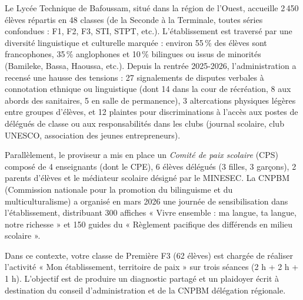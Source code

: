 \documentclass[11pt]{article}
\newcounter{popsec}
\newcounter{popsub}
\newcommand{\courssub}[1]{%
  \stepcounter{popsub}%
  \par\vspace{9pt}\noindent{\popxbold\fontsize{11.5}{13}\selectfont\color{popink}{\color{poporange}\thepopsec.\thepopsub}\hspace{6pt}#1}\par\nopagebreak\vspace{4pt}
}
\begin{document}
\courssub{Situation}
Le Lycée Technique de Bafoussam, situé dans la région de l'Ouest, accueille 2\,450 élèves répartis en 48 classes (de la Seconde à la Terminale, toutes séries confondues : F1, F2, F3, STI, STPT, etc.). L'établissement est traversé par une diversité linguistique et culturelle marquée : environ 55\,\% des élèves sont francophones, 35\,\% anglophones et 10\,\% bilingues ou issus de minorités (Bamileke, Bassa, Haoussa, etc.). Depuis la rentrée 2025-2026, l'administration a recensé une hausse des tensions : 27 signalements de disputes verbales à connotation ethnique ou linguistique (dont 14 dans la cour de récréation, 8 aux abords des sanitaires, 5 en salle de permanence), 3 altercations physiques légères entre groupes d'élèves, et 12 plaintes pour discriminations à l'accès aux postes de délégués de classe ou aux responsabilités dans les clubs (journal scolaire, club UNESCO, association des jeunes entrepreneurs).

Parallèlement, le proviseur a mis en place un \emph{Comité de paix scolaire} (CPS) composé de 4 enseignants (dont le CPE), 6 élèves délégués (3 filles, 3 garçons), 2 parents d'élèves et le médiateur scolaire désigné par le MINESEC. La CNPBM (Commission nationale pour la promotion du bilinguisme et du multiculturalisme) a organisé en mars 2026 une journée de sensibilisation dans l'établissement, distribuant 300 affiches « Vivre ensemble : ma langue, ta langue, notre richesse » et 150 guides du « Règlement pacifique des différends en milieu scolaire ».

Dans ce contexte, votre classe de Première F3 (62 élèves) est chargée de réaliser l'activité « Mon établissement, territoire de paix » sur trois séances (2 h + 2 h + 1 h). L'objectif est de produire un diagnostic partagé et un plaidoyer écrit à destination du conseil d'administration et de la CNPBM délégation régionale.
\end{document}
